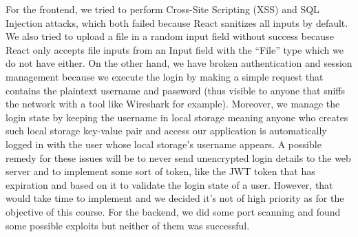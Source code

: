     For the frontend, we tried to perform Cross-Site Scripting (XSS) and SQL Injection attacks, which both failed because React sanitizes all inputs by default. We also tried to upload a file in a random input field without success because React only accepts file inputs from an Input field with the “File” type which we do not have either. On the other hand, we have broken authentication and session management because we execute the login by making a simple request that contains the plaintext username and password (thus visible to anyone that sniffs the network with a tool like Wireshark for example). Moreover, we manage the login state by keeping the username in local storage meaning anyone who creates such local storage key-value pair and access our application is automatically logged in with the user whose local storage’s username appears. A possible remedy for these issues will be to never send unencrypted login details to the web server and to implement some sort of token, like the JWT token that has expiration and based on it to validate the login state of a user. However, that would take time to implement and we decided it's not of high priority as for the objective of this course. 
    For the backend, we did some port scanning and found some possible exploits but neither of them was successful. 